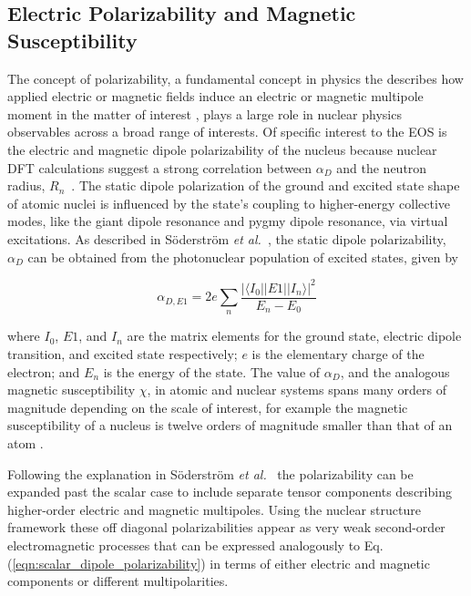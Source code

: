 \documentclass[cnatzke_thesis_proposal.tex]{subfiles}
\begin{document}
\subsection{Electric Polarizability and Magnetic Susceptibility}
The concept of polarizability, a fundamental concept in physics the describes how applied electric or magnetic fields induce an electric or magnetic multipole moment in the matter of interest \cite{jackson_classical_1999}, plays a large role in nuclear physics observables across a broad range of interests.
Of specific interest to the EOS is the electric and magnetic dipole polarizability of the nucleus because nuclear DFT calculations suggest a strong correlation between $\alpha_D$ and the neutron radius, $R_{n}$~\cite{hagen_neutron_2016}. 
The static dipole polarization of the ground and excited state shape of atomic nuclei is influenced by the state's coupling to higher-energy collective modes, like the giant dipole resonance and pygmy dipole resonance, via virtual excitations. 
As described in S\"oderstr\"om \textit{et al.}~\cite{soderstrom_electromagnetic_2020}, the static dipole polarizability, $\alpha_D$ can be obtained from the photonuclear population of excited states, given by

\begin{equation} \label{eqn:scalar_dipole_polarizability}
    \alpha_{D,E1} = 2 e \sum_n \frac{|\langle I_0 || E1 || I_n \rangle |^2}{E_n - E_0}
\end{equation}

where $I_0$, $E1$, and $I_n$ are the matrix elements for the ground state, electric dipole transition, and excited state respectively; $e$ is the elementary charge of the electron; and $E_n$ is the energy of the state. 
The value of $\alpha_D$, and the analogous magnetic susceptibility $\chi$, in atomic and nuclear systems spans many orders of magnitude depending on the scale of interest, for example the magnetic susceptibility of a nucleus is twelve orders of magnitude smaller than that of an atom \cite{knupfer_scaling_1985}.

Following the explanation in S\"oderstr\"om \textit{et al.}~\cite{soderstrom_electromagnetic_2020} the polarizability can be expanded past the scalar case to include separate tensor components describing higher-order electric and magnetic multipoles. 
Using the nuclear structure framework these off diagonal polarizabilities appear as very weak second-order electromagnetic processes that can be expressed analogously to Eq. (\ref{eqn:scalar_dipole_polarizability}) in terms of either electric and magnetic components or different multipolarities. 
\end{document}
